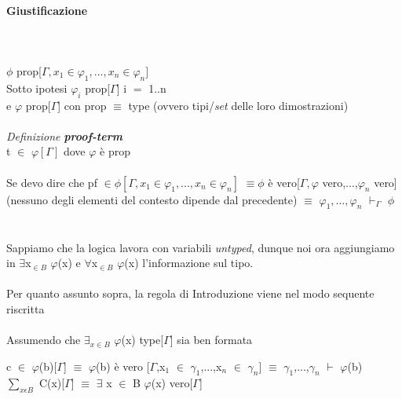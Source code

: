 \paragraph{Giustificazione}\mbox{}\\\\
\noindent
$\phi$ prop[$\Gamma,x_1 \in \varphi_1,...,x_n \in \varphi_n]$\\
\noindent Sotto ipotesi $\varphi_i$ prop[$\Gamma$] \quad i $=$ 1..n\\
\noindent e $\varphi$ prop[$\Gamma$] con prop $\equiv$ type (ovvero tipi/\textit{set} delle loro dimostrazioni)\\\\
\noindent
\textit{Definizione} \textbf{\textit{proof-term}}\\ t $\in$ $\varphi[\Gamma]$ dove $\varphi$ \`e prop\\\\
\noindent 
Se devo dire che
pf $\in \phi[\Gamma,x_1 \in \varphi_1,...,x_n \in \varphi_n]$
$\equiv \phi$ \`e vero[$\Gamma, \varphi$ vero,...,$\varphi_n$ vero] (nessuno degli elementi del contesto dipende dal precedente)
$\equiv$ $\varphi_1,...,\varphi_n$ $\vdash_\Gamma$ $\phi$
\\\\\\
\noindent
Sappiamo che la logica lavora con variabili \textit{untyped}, dunque noi ora aggiungiamo in  $\exists$x$_{\in B}$ $\varphi$(x) e $\forall$x$_{\in B}$ $\varphi$(x) l'informazione sul tipo.
\\\\
\noindent
Per quanto assunto sopra, la regola di Introduzione viene nel modo sequente riscritta\\\\
\noindent
Assumendo che $\exists_{x \in B}$ $\varphi$(x) type[$\Gamma$] sia ben formata
\begin{prooftree}
\end{prooftree}
\noindent
c $\in$ $\varphi$(b)[$\Gamma$] $\equiv$ $\varphi$(b) \`e vero [$\Gamma$,x$_1$ $\in$ $\gamma_1$,...,x$_n$ $\in$ $\gamma_n$] $\equiv$ $\gamma_1$,...,$\gamma_n$ $\vdash$ $\varphi$(b)\\
$\sum\limits_{x \epsilon B}$ C(x)[$\Gamma$] $\equiv$ $\exists$ x $\in$ B $\varphi$(x) vero[$\Gamma$]\\\\
